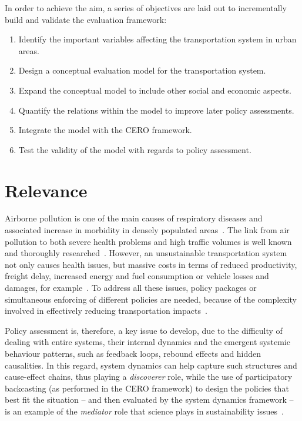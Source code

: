 In order to achieve the aim, a series of objectives are laid out to incrementally build and validate the evaluation framework:
%
\begin{enumerate}[label=(\alph*)]
	\item Identify the important variables affecting the transportation system in urban areas.
	\item Design a conceptual evaluation model for the transportation system.
	\item Expand the conceptual model to include other social and economic aspects.
	\item Quantify the relations within the model to improve later policy assessments.
	\item Integrate the model with the CERO framework.
	\item Test the validity of the model with regards to policy assessment.
\end{enumerate}

\section{Relevance}
\label{s:relevance}
Airborne pollution is one of the main causes of respiratory diseases and associated increase in morbidity in densely populated areas~\parencite{who2013review,vimercati2011airpollutionmorbidity}. The link from air pollution to both severe health problems and high traffic volumes is well known and thoroughly researched~\parencite{who2006air}. However, an unsustainable transportation system not only causes health issues, but massive costs in terms of reduced productivity, freight delay, increased energy and fuel consumption or vehicle losses and damages, for example~\parencite{lizeng2012costcongestion}. To address all these issues, policy packages or simultaneous enforcing of different policies are needed, because of the complexity involved in effectively reducing transportation impacts~\parencite[ch. 3, p. 45]{garcia2014travel}.

Policy assessment is, therefore, a key issue to develop, due to the difficulty of dealing with entire systems, their internal dynamics and the emergent systemic behaviour patterns, such as feedback loops, rebound effects and hidden causalities. In this regard, system dynamics can help capture such structures and cause-effect chains, thus playing a \textit{discoverer} role, while the use of participatory backcasting (as performed in the CERO framework) to design the policies that best fit the situation -- and then evaluated by the system dynamics framework -- is an example of the \textit{mediator} role that science plays in sustainability issues~\parencite{ozawa1996science}.


